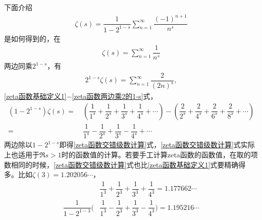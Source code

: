 \begin{itemize}[leftmargin=\inteval{\myitemleftmargin}pt,itemsep=
   \inteval{\myitemitempsep}pt,topsep=\inteval{\myitemtopsep}pt]
下面介绍
\begin{align}\label{zeta函数交错级数计算}
    \zeta(s)=\dfrac{1}{1-2^{1-s}}\sum\limits_{n=1}^{\infty}
    \dfrac{(-1)^{n+1}}{n^s}
\end{align}
是如何得到的，在
\begin{align}\label{zeta函数基础定义1}
    \zeta(s)=\sum\limits_{n=1}^{\infty} \dfrac{1}{n^s}
\end{align}
两边同乘$ 2^{1-s} $，有
\begin{align}\label{zeta函数两边乘2的1-s}
    2^{1-s}\zeta(s)=\sum\limits_{n=1}^{\infty} \dfrac{2}{(2n)^s},
\end{align}
\eqref{zeta函数基础定义1}$ - $\eqref{zeta函数两边乘2的1-s}式，
\begin{align*}
    (1-2^{1-s})\zeta(s)=&\ \left(\dfrac{1}{1^s}+\dfrac{1}{2^s}+
    \dfrac{1}{3^s}+\dfrac{1}{4^s}+\cdots\right)-
    \left(\dfrac{2}{2^s}+\dfrac{2}{4^s}+
    \dfrac{2}{6^s}+\dfrac{2}{8^s}+\cdots\right)\\
    =&\ \dfrac{1}{1^s}-\dfrac{1}{2^s}+\dfrac{1}{3^s}-\dfrac{1}{4^s}+\cdots
\end{align*}
两边除以$ 1-2^{1-s} $即得\eqref{zeta函数交错级数计算}式，\eqref{zeta函数交错级数计算}式实际上也适用于$ \Re s>1 $时的函数值的计算。若要手工计算zeta函数的函数值，在取的项数相同的时候，\eqref{zeta函数交错级数计算}式也比\eqref{zeta函数基础定义1}式要精确得多。比如$ \zeta(3)=1.202056\cdots $，
\begin{align*}
    &\dfrac{1}{1^3}+\dfrac{1}{2^3}+\dfrac{1}{3^3}+\dfrac{1}{4^3} =1.177662\cdots \\
    \dfrac{1}{1-2^{1-3}}\Big( &\dfrac{1}{1^3}-\dfrac{1}{2^3}+\dfrac{1}{3^3}-
    \dfrac{1}{4^3}\Big) =1.195216\cdots
\end{align*}    
\\

\end{itemize}
